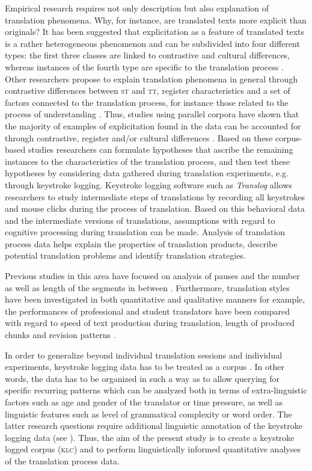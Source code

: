 \documentclass[output=paper]{LSP/langsci}
\begin{document}
Empirical research requires not only description but also explanation of translation phenomena. Why, for instance, are translated texts more explicit than originals? It has been suggested that explicitation as a feature of translated texts is a rather heterogeneous phenomenon and can be subdivided into four different types: the first three classes are linked to contrastive and cultural differences, whereas instances of the fourth type are specific to the translation process \citep[82--83]{Klaudy1998}. Other researchers propose to explain translation phenomena in general through contrastive differences between \textsc{st} and \textsc{tt}, register characteristics and a set of factors connected to the translation process, for instance those related to the process of understanding \citep{Steiner2001}. Thus, studies using parallel corpora have shown that the majority of examples of explicitation found in the data can be accounted for through contrastive, register and/or cultural differences \citep{Hansen-Schirra2007,Becher2010}. Based on these corpus-based studies researchers can formulate hypotheses that ascribe the remaining instances to the characteristics of the translation process, and then test these hypotheses by considering data gathered during translation experiments, e.g. through keystroke logging. Keystroke logging software such as \textit{Translog} \citep{Jakobsen1999} allows researchers to study intermediate steps of translations by recording all keystrokes and mouse clicks during the process of translation. Based on this behavioral data and the intermediate versions of translations, assumptions with regard to cognitive processing during translation can be made. Analysis of translation process data helps explain the properties of translation products, describe potential translation problems and identify translation strategies.

Previous studies in this area have focused on analysis of pauses and the number as well as length of the segments in between \citep[e.g.][]{Dragsted2005,Jakobsen2005,Alves2009,Alves2011}. Furthermore, translation styles have been investigated in both quantitative and qualitative manners \citep[e.g.][]{Pagano2008, CarlandDragsted2011} for example, the performances of professional and student translators have been compared with regard to speed of text production during translation, length of produced chunks and revision patterns \citep[e.g.][]{Jakobsen2005}.
 
In order to generalize beyond individual translation sessions and individual experiments, keystroke logging data has to be treated as a corpus \citep{Alves2004, Alves2009, Alves2011}. In other words, the data has to be organized in such a way as to allow querying for specific recurring patterns \citep{Carl2009} which can be analyzed both in terms of extra-linguistic factors such as age and gender of the translator or time pressure, as well as linguistic features such as level of grammatical complexity or word order. The latter research questions require additional linguistic annotation of the keystroke logging data (see ). Thus, the aim of the present study is to create a keystroke logged corpus (\textsc{klc}) and to perform linguistically informed quantitative analyses of the translation process data.
\end{document}
